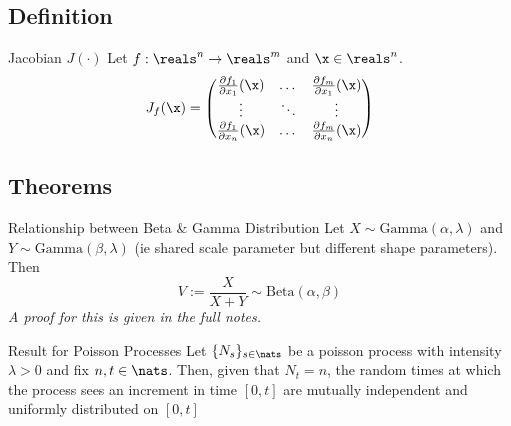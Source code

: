 \documentclass[11pt,a4paper]{article}
\begin{document}
\subsection{Definition}

\begin{definition}{Jacobian $J(\cdot)$}
  Let $f:\reals^n\to\reals^m$ and $\x\in\reals^n$.
  \[ J_f(\x)=\begin{pmatrix}
    \frac{\partial f_1}{\partial x_1}(\x)&\dots&\frac{\partial f_m}{\partial x_1}(\x)\\
    \vdots&\ddots&\vdots\\
    \frac{\partial f_1}{\partial x_n}(\x)&\dots&\frac{\partial f_m}{\partial x_n}(\x)
  \end{pmatrix} \]
\end{definition}

\subsection{Theorems}

\begin{theorem}{Relationship between Beta \& Gamma Distribution}
  Let $X\sim\text{Gamma}(\alpha,\lambda)$ and $Y\sim\text{Gamma}(\beta,\lambda)$ (ie shared scale parameter but different shape parameters). Then
  \[ V:=\frac{X}{X+Y}\sim\text{Beta}(\alpha,\beta) \]
  \textit{A proof for this is given in the full notes.}
\end{theorem}

\begin{theorem}{Result for Poisson Processes}
  Let $\{N_s\}_{s\in\nats}$ be a poisson process with intensity $\lambda>0$ and fix $n,t\in\nats$. Then, given that $N_t=n$, the random times at which the process sees an increment in time $[0,t]$ are mutually independent and uniformly distributed on $[0,t]$
\end{theorem}
\end{document}
